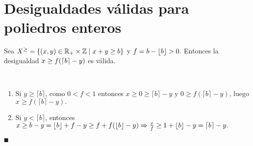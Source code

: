 \documentclass[MIOP.tex]{subfiles}
\begin{document}
\section{Desigualdades válidas para poliedros enteros}
\begin{prop}
 Sea $X^{\geq}=\{(x,y)\in\mathbb{R}_+\times \mathbb{Z} \mid x+y \geq b\}$ y $f= b-\left\lfloor{b}\right\rfloor>0$. Entonces la desigualdad $x\geq f(\left\lceil{b}\right\rceil-y)$ es válida.
\end{prop}

\begin{dem}\
\begin{enumerate}
\item Si $y\geq\lceil b\rceil$, como $0<f<1$ entonces $x\geq 0\geq \lceil b\rceil-y$ y $0\geq f(\lceil b\rceil-y)$, luego $x\geq f(\lceil b\rceil-y).$
\item Si $y<\lceil b\rceil$, entonces $x\geq b-y=\lfloor b\rfloor+f-y\geq f+f(\lfloor b\rfloor-y)\Rightarrow \frac{x}{f}\geq 1+\lfloor b\rfloor-y=\left\lceil{b}\right\rceil-y.$
\end{enumerate}
$\QED$
\end{dem}
\end{document}
